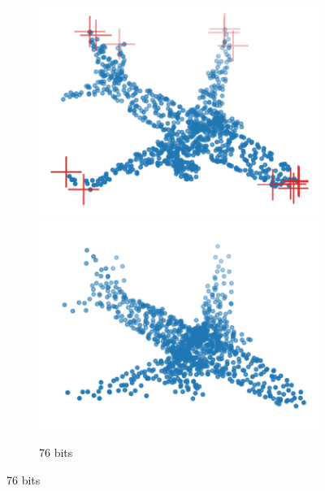\begin{figure}[t]
\begin{subfigure}[b]{\subfigureouterhspace}
\begin{subsubfigure}[b]{\subfigurehspace}
      \centering
      \includegraphics[width=\linewidth]{img/point_cloud_compression/crit/test_airplane_0630/micro_4.pdf}
      \includegraphics[width=\linewidth]{img/point_cloud_compression/rec/test_airplane_0630/micro_4.pdf}
      \caption{76 bits}
      \label{fig:rec/micro/4}
    \end{subsubfigure}%
    \hfill%
    \begin{subsubfigure}[b]{\subfigurehspace}
      \centering

\end{subsubfigure}
\end{subfigure}
\end{figure}
